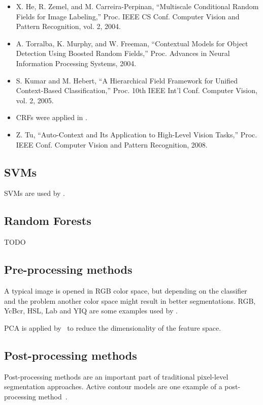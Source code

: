 \begin{itemize}
    \item X. He, R. Zemel, and M. Carreira-Perpinan, “Multiscale Conditional
          Random Fields for Image Labeling,” Proc. IEEE CS Conf. Computer
          Vision and Pattern Recognition, vol. 2, 2004.
    \item A. Torralba, K. Murphy, and W. Freeman, “Contextual Models for
          Object Detection Using Boosted Random Fields,” Proc. Advances in
          Neural Information Processing Systems, 2004.
    \item S. Kumar and M. Hebert, “A Hierarchical Field Framework for
          Unified Context-Based Classification,” Proc. 10th IEEE Int’l Conf.
          Computer Vision, vol. 2, 2005.
    \item \Glspl{CRF} were applied in \cite{shotton2006textonboost}.
    \item Z. Tu, “Auto-Context and Its Application to High-Level Vision
          Tasks,” Proc. IEEE Conf. Computer Vision and Pattern Recognition,
          2008.
\end{itemize}


\subsection{SVMs}\label{subsec:trad-SVM}%

\Glspl{SVM} are used by \cite{yang2012layered}.


\subsection{Random Forests}\label{subsec:random-forests}

TODO


\subsection{Pre-processing methods}\label{subsec:preprocessing-methods}%
A typical image is opened in RGB color space, but depending on the classifier
and the problem another color space might result in better segmentations. RGB,
YcBcr, HSL, Lab and YIQ are some examples used by \cite{cohen2015memory}.

\Gls{PCA} is applied by~\cite{chen2011pixel} to reduce the dimensionality of
the feature space.

\subsection{Post-processing methods}%
\label{subsec:post-processing-methods}%
Post-processing methods are an important part of traditional pixel-level
segmentation approaches. Active contour models are one example of a
post-processing method~\cite{kass1988snakes}.

